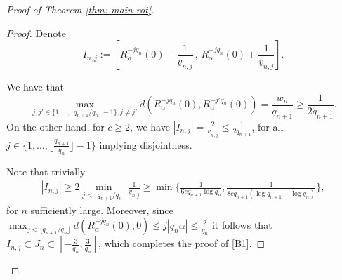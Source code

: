\documentclass[11pt]{amsart}
\theoremstyle{definition}
\numberwithin{equation}{section}
\begin{document}
\begin{proof}[Proof of Theorem \ref{thm: main rot}]
\begin{proof}
  Denote 
 $$I_{n,j}:=\left[ R_{\alpha}^{-jq_n}(0)-\frac{1}{\underline{v}_{n,j}}\, ,\, R_{\alpha}^{-jq_n}(0) + \frac{1}{\underline{v}_{n,j}}\right].$$ 
 
We have that 
\begin{equation}
 \max_{j, j'\in  \{1,\ldots, \lfloor q_{n+1}/q_n\rfloor-1\}, j\neq j'}d(R_{\alpha}^{-jq_n}(0),R_{\alpha}^{-j'q_n}(0))= \frac{w_n}{q_{n+1}}\geq \frac{1}{2q_{n+1}}.\label{eq: max j j'}
\end{equation}
 On the other hand, for $c\geq 2$, we have 
 $|I_{n,j}|=\frac{2}{\underline{v}_{n,j}}\leq \frac{1}{2q_{n+1}}$, for all $j \in \{ 1,\ldots, \lfloor \frac{q_{n+1}}{q_n}\rfloor-1\}$ implying disjointness.  

 
Note that trivially 
\begin{align*}
  |I_{n,j}|\geq 2 \min_{j< \lfloor q_{n+1}/q_n\rfloor} \frac{1}{\underline{v}_{n,j}}
  \geq \min\Big\{ \frac{1}{6cq_{n+1}\log q_n}, \frac{1}{8c q_{n+1}(\log q_{n+1}-\log q_n)}\Big\},
 \end{align*}
for $n$ sufficiently large.
 Moreover,  since $\max_{j<\lfloor q_{n+1}/q_n\rfloor}d(R_{\alpha}^{-jq_n}(0),0)\leq j|q_n\alpha|\leq \frac{2}{q_n}$ it follows that $I_{n,j}\subset J_n\subset [-\frac{3}{q_n}, \frac{3}{q_n}]$, which completes the proof of \ref{B1}.


\end{proof}
\end{proof}
\end{document}
